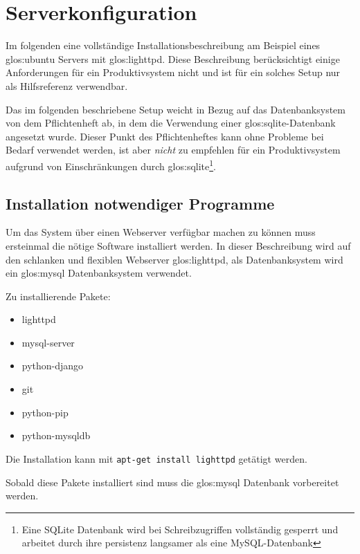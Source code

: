 \chapter{Serverkonfiguration}
Im folgenden eine vollständige Installationsbeschreibung am Beispiel eines
\Gls{glos:ubuntu} Servers mit \Gls{glos:lighttpd}. Diese
Beschreibung berücksichtigt einige Anforderungen für ein Produktivsystem nicht
und ist für ein solches Setup nur als Hilfsreferenz verwendbar. 

Das im folgenden beschriebene Setup weicht in Bezug auf das Datenbanksystem von
dem Pflichtenheft ab, in dem die Verwendung einer \Gls{glos:sqlite}-Datenbank
angesetzt wurde. Dieser Punkt des Pflichtenheftes kann ohne Probleme bei Bedarf
verwendet werden, ist aber \emph{nicht} zu empfehlen für ein Produktivsystem aufgrund
von Einschränkungen durch \Gls{glos:sqlite}\footnote{Eine SQLite Datenbank wird
bei Schreibzugriffen vollständig gesperrt und arbeitet durch ihre persistenz
langsamer als eine MySQL-Datenbank}.

\section{Installation notwendiger Programme}
Um das System über einen Webserver verfügbar machen zu können muss ersteinmal
die nötige Software installiert werden. In dieser Beschreibung wird auf den
schlanken und flexiblen Webserver \Gls{glos:lighttpd}, als Datenbanksystem wird
ein \Gls{glos:mysql} Datenbanksystem verwendet.

Zu installierende Pakete:
\begin{itemize}
  \item lighttpd
  \item mysql-server
  \item python-django
  \item git
  \item python-pip
  \item python-mysqldb
\end{itemize}
Die Installation kann mit \zB \lstinline{apt-get install lighttpd} getätigt
werden.

Sobald diese Pakete installiert sind muss die \Gls{glos:mysql} Datenbank
vorbereitet werden.

